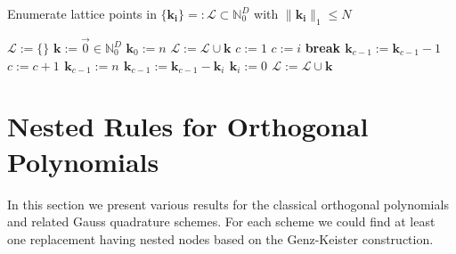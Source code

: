 \documentclass[a4paper,10pt]{article}
\begin{document}
\begin{algorithm}[h!]
  \caption{Enumerate lattice points in $\{\mathbf{k_{i}}\} =: \mathcal{L} \subset \mathbb{N}_{0}^{D}$
    with $\|\mathbf{k_{i}}\|_{1} \leq N$}
  \label{alg:ca_enumerate_lattice_points}
  \begin{algorithmic}
      \State $\mathcal{L} := \{\} $
        \State $\mathbf{k} := \vec{0} \in \mathbb{N}_{0}^{D}$
        \State $\mathbf{k}_{0} := n$
        \State $\mathcal{L} := \mathcal{L} \cup \mathbf{k}$
        \State $c := 1$
              \State $c := i$
                \State \bf{break}
              \EndIf
            \EndFor
            \State $\mathbf{k}_{c-1} := \mathbf{k}_{c-1} - 1$
            \State $c := c +1$
            \State $\mathbf{k}_{c-1} := n$
              \State $\mathbf{k}_{c-1} := \mathbf{k}_{c-1} - \mathbf{k}_{i}$
            \EndFor
                \State $\mathbf{k}_{i} := 0$
              \EndFor
            \EndIf
            \State $\mathcal{L} := \mathcal{L} \cup \mathbf{k}$
          \EndIf
        \EndWhile
      \EndFor
    \EndProcedure
  \end{algorithmic}
\end{algorithm}


\FloatBarrier
\section{Nested Rules for Orthogonal Polynomials}
\label{sec:nested_rules_for_op}

In this section we present various results for the classical orthogonal polynomials
and related Gauss quadrature schemes. For each scheme we could find at least one
replacement having nested nodes based on the Genz-Keister construction.
\end{document}
